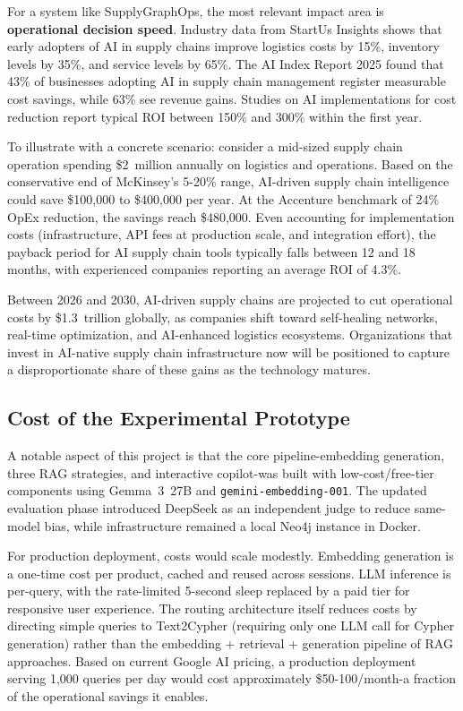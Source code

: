 \documentclass[11pt,a4paper]{article}
\begin{document}
For a system like SupplyGraphOps, the most relevant impact area is \textbf{operational decision speed}. Industry data from StartUs Insights shows that early adopters of AI in supply chains improve logistics costs by 15\%, inventory levels by 35\%, and service levels by 65\%. The AI Index Report 2025 found that 43\% of businesses adopting AI in supply chain management register measurable cost savings, while 63\% see revenue gains. Studies on AI implementations for cost reduction report typical ROI between 150\% and 300\% within the first year.

To illustrate with a concrete scenario: consider a mid-sized supply chain operation spending \$2~million annually on logistics and operations. Based on the conservative end of McKinsey's 5-20\% range, AI-driven supply chain intelligence could save \$100{,}000 to \$400{,}000 per year. At the Accenture benchmark of 24\% OpEx reduction, the savings reach \$480{,}000. Even accounting for implementation costs (infrastructure, API fees at production scale, and integration effort), the payback period for AI supply chain tools typically falls between 12 and 18 months, with experienced companies reporting an average ROI of 4.3\%.

Between 2026 and 2030, AI-driven supply chains are projected to cut operational costs by \$1.3~trillion globally, as companies shift toward self-healing networks, real-time optimization, and AI-enhanced logistics ecosystems. Organizations that invest in AI-native supply chain infrastructure now will be positioned to capture a disproportionate share of these gains as the technology matures.

\subsection{Cost of the Experimental Prototype}

A notable aspect of this project is that the core pipeline-embedding generation, three RAG strategies, and interactive copilot-was built with low-cost/free-tier components using Gemma~3~27B and \texttt{gemini-embedding-001}. The updated evaluation phase introduced DeepSeek as an independent judge to reduce same-model bias, while infrastructure remained a local Neo4j instance in Docker.

For production deployment, costs would scale modestly. Embedding generation is a one-time cost per product, cached and reused across sessions. LLM inference is per-query, with the rate-limited 5-second sleep replaced by a paid tier for responsive user experience. The routing architecture itself reduces costs by directing simple queries to Text2Cypher (requiring only one LLM call for Cypher generation) rather than the embedding + retrieval + generation pipeline of RAG approaches. Based on current Google AI pricing, a production deployment serving 1{,}000 queries per day would cost approximately \$50-100/month-a fraction of the operational savings it enables.
\end{document}
